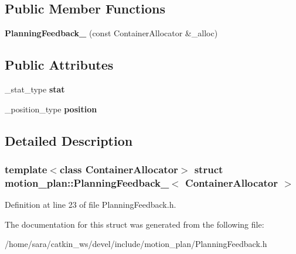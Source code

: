 \subsection*{Public Member Functions}
\begin{DoxyCompactItemize}
\item 
\mbox{\label{structmotion__plan_1_1PlanningFeedback___a8632e79ff79889c2e7e411752f8551d4}} 
{\bfseries Planning\+Feedback\+\_\+} (const Container\+Allocator \&\+\_\+alloc)
\end{DoxyCompactItemize}
\subsection*{Public Attributes}
\begin{DoxyCompactItemize}
\item 
\mbox{\label{structmotion__plan_1_1PlanningFeedback___aca70b393ae7b583a2042361f32297b2b}} 
\+\_\+stat\+\_\+type {\bfseries stat}
\item 
\mbox{\label{structmotion__plan_1_1PlanningFeedback___afcc9f5407b9ceb1d927fb43317bcb0c6}} 
\+\_\+position\+\_\+type {\bfseries position}
\end{DoxyCompactItemize}


\subsection{Detailed Description}
\subsubsection*{template$<$class Container\+Allocator$>$\newline
struct motion\+\_\+plan\+::\+Planning\+Feedback\+\_\+$<$ Container\+Allocator $>$}



Definition at line 23 of file Planning\+Feedback.\+h.



The documentation for this struct was generated from the following file\+:\begin{DoxyCompactItemize}
\item 
/home/sara/catkin\+\_\+ws/devel/include/motion\+\_\+plan/Planning\+Feedback.\+h\end{DoxyCompactItemize}
